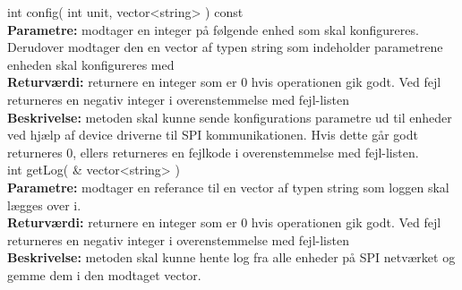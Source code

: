 int config( int unit, vector<string> ) const \\
\textbf{Parametre:} modtager en integer på følgende enhed som skal konfigureres. Derudover modtager den en vector af typen string som indeholder parametrene enheden skal konfigureres med \\
\textbf{Returværdi:} returnere en integer som er 0 hvis operationen gik godt. Ved fejl returneres en negativ integer i overenstemmelse med fejl-listen  \\
\textbf{Beskrivelse:} metoden skal kunne sende konfigurations parametre ud til enheder ved hjælp af device driverne til SPI kommunikationen. Hvis dette går godt returneres 0, ellers returneres en fejlkode i overenstemmelse med fejl-listen.\\

int getLog( \& vector<string>  ) \\
\textbf{Parametre:}  modtager en referance til en vector af typen string som loggen skal lægges over i.\\
\textbf{Returværdi:} returnere en integer som er 0 hvis operationen gik godt. Ved fejl returneres en negativ integer i overenstemmelse med fejl-listen  \\
\textbf{Beskrivelse:} metoden skal kunne hente log fra alle enheder på SPI netværket og gemme dem i den modtaget vector. \\








